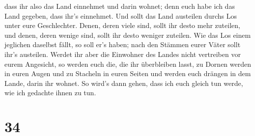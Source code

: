  dass ihr also das Land einnehmet und darin wohnet; denn
euch habe ich das Land gegeben, dass ihr's einnehmet. 
Und sollt das Land austeilen durchs Los unter eure Geschlechter. Denen,
deren viele sind, sollt ihr desto mehr zuteilen, und denen, deren wenige
sind, sollt ihr desto weniger zuteilen. Wie das Los einem jeglichen
daselbst fällt, so soll er's haben; nach den Stämmen eurer Väter sollt
ihr's austeilen.  Werdet ihr aber die Einwohner des
Landes nicht vertreiben vor eurem Angesicht, so werden euch die, die ihr
überbleiben lasst, zu Dornen werden in euren Augen und zu Stacheln in
euren Seiten und werden euch drängen in dem Lande, darin ihr wohnet.
 So wird's dann gehen, dass ich euch gleich tun werde,
wie ich gedachte ihnen zu tun.

\hypertarget{section-33}{%
\section{34}\label{section-33}}

